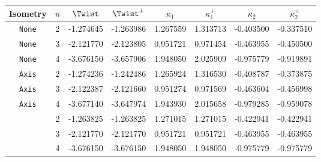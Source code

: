 
%
\begin{tabular*}{\textwidth}{@{\extracolsep\fill}cc|cc|cc|cc@{}}
\toprule
Isometry & \(n\) & \(\Twist\) & \(\Twist^+\) & \(\kappa_1\) & \(\kappa_1^+\) & \(\kappa_2\) & \(\kappa_2^+\) \\
\midrule %
\texttt{None}    & 2 & -1.274645 & -1.263986  & 1.267559 & 1.313713 & -0.403500  & -0.337510 \\
\texttt{None}    & 3 & -2.121770 & -2.123805  & 0.951721 & 0.971454 & -0.463955  & -0.450500 \\
\texttt{None}    & 4 & -3.676150 & -3.657906  & 1.948050 & 2.025909 & -0.975779  & -0.919891 \\
\hline                                                                  
\texttt{Axis}    & 2 & -1.274236 & -1.242486  & 1.265924 & 1.316530 & -0.408787  & -0.373875 \\
\texttt{Axis}    & 3 & -2.122387 & -2.121660  & 0.951274 & 0.971569 & -0.463604  & -0.456998 \\
\texttt{Axis}    & 4 & -3.677140 & -3.647974  & 1.943930 & 2.015658 & -0.979285  & -0.959078 \\
\hline                                                                  
\Spherical{}   & 2 & -1.263825 & -1.263825  & 1.271015 & 1.271015 & -0.422941  & -0.422941 \\
\Spherical{}   & 3 & -2.121770 & -2.121770  & 0.951721 & 0.951721 & -0.463955  & -0.463955 \\
\Spherical{}   & 4 & -3.676150 & -3.676150  & 1.948050 & 1.948050 & -0.975779  & -0.975779 \\
\hline
\end{tabular*}